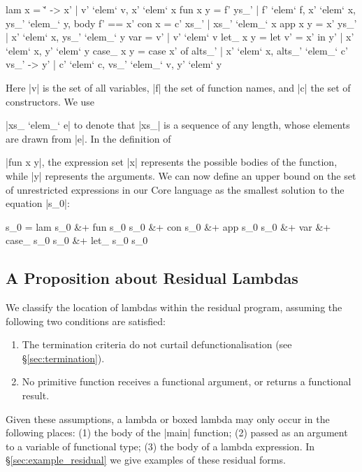 \documentclass[preprint]{sigplanconf}
\begin{document}
\ignore\begin{code}
lam x      = {\v' -> x' | v' `elem` v, x' `elem` x}
fun x y    = {f' ys_' | f' `elem` f, x' `elem` x, ys_' `elem_` y, body f' == x'}
con x      = {c' xs_' | xs_' `elem_` x}
app x y    = {x' ys_' | x' `elem` x, ys_' `elem_` y}
var        = {v' | v' `elem` v}
let_ x y   = {let v' = x' in y' | x' `elem` x, y' `elem` y}
case_ x y  = {case  x' of alts_' | x' `elem` x,
                    alts_' `elem_` {c' vs_' -> y' | c' `elem` c, vs_' `elem_` v, y' `elem` y}}
\end{code}

Here |v| is the set of all variables, |f| the set of function names, and |c| the set of constructors. We use \ignore|xs_ `elem_` e| to denote that |xs_| is a sequence of any length, whose elements are drawn from |e|. In the definition of \ignore|fun x y|, the expression set |x| represents the possible bodies of the function, while |y| represents the arguments. We can now define an upper bound on the set of unrestricted expressions in our Core language as the smallest solution to the equation |s_0|:

\ignore\begin{code}
s_0  =  lam s_0 &+ fun s_0 s_0 &+ con s_0 &+ app s_0 s_0 &+ var &+
        case_ s_0 s_0 &+ let_ s_0 s_0
\end{code}

\subsection{A Proposition about Residual Lambdas}

We classify the location of lambdas within the residual program, assuming the following two conditions are satisfied:

\begin{enumerate}
\item The termination criteria do not curtail defunctionalisation (see \S\ref{sec:termination}).
\item No primitive function receives a functional argument, or returns a functional result.
\end{enumerate}

Given these assumptions, a lambda or boxed lambda may only occur in the following places: (1) the body of the |main| function; (2) passed as an argument to a variable of functional type; (3) the body of a lambda expression. In \S\ref{sec:example_residual} we give examples of these residual forms.
\end{document}
